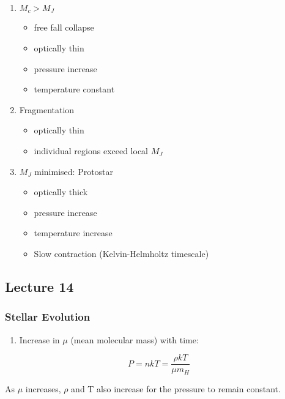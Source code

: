 \documentclass[a4paper,11pt,normalem]{article}
\begin{document}
\begin{enumerate}
\def\labelenumi{\arabic{enumi}.}
\item
  \(M_c > M_J\)

  \begin{itemize}
  \item
    free fall collapse
  \item
    optically thin
  \item
    pressure increase
  \item
    temperature constant
  \end{itemize}
\item
  Fragmentation

  \begin{itemize}
  \item
    optically thin
  \item
    individual regions exceed local \(M_J\)
  \end{itemize}
\item
  \(M_J\) minimised: Protostar

  \begin{itemize}
  \item
    optically thick
  \item
    pressure increase
  \item
    temperature increase
  \item
    Slow contraction (Kelvin-Helmholtz timescale)
  \end{itemize}
\end{enumerate}

\subsection{Lecture 14}\label{lecture-14}

\subsubsection{Stellar Evolution}\label{stellar-evolution}

\begin{enumerate}
\def\labelenumi{\arabic{enumi}.}
\item
  Increase in \(\mu\) (mean molecular mass) with time:
\end{enumerate}

\[
    P = nkT = \frac{\rho kT}{\mu m_H}
\]

As \(\mu\) increases, \(\rho\) and T also increase for the pressure to
remain constant.
\end{document}

